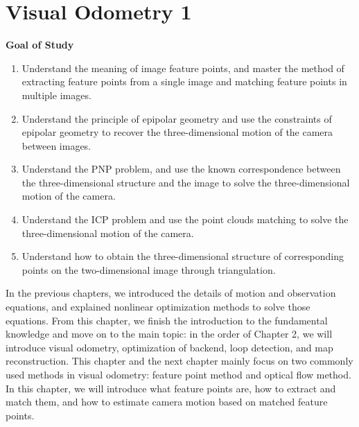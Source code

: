 \chapter{Visual Odometry 1}
\label{cpt:7}
\thispagestyle{empty}

\begin{mdframed}  
	\textbf{Goal of Study}
	\begin{enumerate}[labelindent=0em,leftmargin=1.5em]
		\item Understand the meaning of image feature points, and master the method of extracting feature points from a single image and matching feature points in multiple images.
		\item Understand the principle of epipolar geometry and use the constraints of epipolar geometry to recover the three-dimensional motion of the camera between images.
		\item Understand the PNP problem, and use the known correspondence between the three-dimensional structure and the image to solve the three-dimensional motion of the camera.
		\item Understand the ICP problem and use the point clouds matching to solve the three-dimensional motion of the camera.
		\item Understand how to obtain the three-dimensional structure of corresponding points on the two-dimensional image through triangulation.
	\end{enumerate}
\end{mdframed}

In the previous chapters, we introduced the details of motion and observation equations, and explained nonlinear optimization methods to solve those equations. From this chapter, we finish the introduction to the fundamental knowledge and move on to the main topic: in the order of Chapter 2, we will introduce visual odometry, optimization of backend, loop detection, and map reconstruction. This chapter and the next chapter mainly focus on two commonly used methods in visual odometry: feature point method and optical flow method. In this chapter, we will introduce what feature points are, how to extract and match them, and how to estimate camera motion based on matched feature points.

\newpage


\newpage


